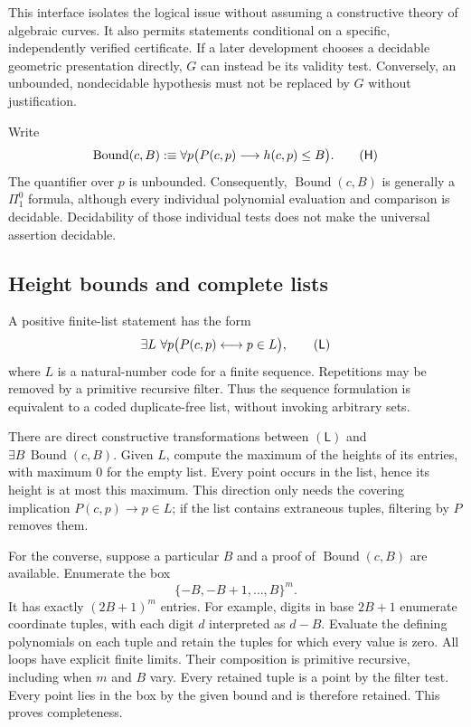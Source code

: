 This interface isolates the logical issue without assuming a constructive
theory of algebraic curves.  It also permits statements conditional on a
specific, independently verified certificate.  If a later development chooses
a decidable geometric presentation directly, $G$ can instead be its validity
test.  Conversely, an unbounded, nondecidable hypothesis must not be replaced
by $G$ without justification.

Write
\[
 \operatorname{Bound}(c,B):\equiv
 \forall p\bigl(P(c,p)\longrightarrow h(c,p)\leq B\bigr).
 \tag{\textsf{H}}
\]
The quantifier over $p$ is unbounded.  Consequently,
$\operatorname{Bound}(c,B)$ is generally a $\Pi^0_1$ formula, although every
individual polynomial evaluation and comparison is decidable.  Decidability
of those individual tests does not make the universal assertion decidable.

\subsection{Height bounds and complete lists}

A positive finite-list statement has the form
\[
 \exists L\ \forall p\bigl(P(c,p)\longleftrightarrow p\in L\bigr),
 \tag{\textsf{L}}
\]
where $L$ is a natural-number code for a finite sequence.  Repetitions may be
removed by a primitive recursive filter.  Thus the sequence formulation is
equivalent to a coded duplicate-free list, without invoking arbitrary sets.

There are direct constructive transformations between $(\mathsf L)$ and
$\exists B\,\operatorname{Bound}(c,B)$.  Given $L$, compute the maximum of the
heights of its entries, with maximum $0$ for the empty list.  Every point
occurs in the list, hence its height is at most this maximum.  This direction
only needs the covering implication $P(c,p)\to p\in L$; if the list contains
extraneous tuples, filtering by $P$ removes them.

For the converse, suppose a particular $B$ and a proof of
$\operatorname{Bound}(c,B)$ are available.  Enumerate the box
\[
 \{-B,-B+1,\ldots,B\}^{m}.
\]
It has exactly $(2B+1)^m$ entries.  For example, digits in base $2B+1$
enumerate coordinate tuples, with each digit $d$ interpreted as $d-B$.
Evaluate the defining polynomials on each tuple and retain the tuples for
which every value is zero.  All loops have explicit finite limits.  Their
composition is primitive recursive, including when $m$ and $B$ vary.
Every retained tuple is a point by the filter test.  Every point lies in the
box by the given bound and is therefore retained.  This proves completeness.

